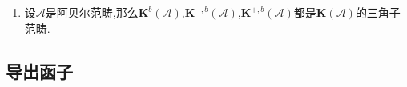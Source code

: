 \begin{enumerate}
\begin{proof}
    	如果$Z$是零调复形,考虑这个好三角诱导的长正合列,就得到$u$是一个拟同构.反过来如果$u$是拟同构,为了证明$Z$是零调复形,只需验证$\mathscr{A}$中的如下正合列如果$X\to Y$和$A\to B$是同构,那么$C$是零对象:同构$X\to Y$的像是它本身,于是$Y\to Z$的核是同构,于是$Y\to Z$是零态射,同理有$Z\to A$是零态射.但是零态射的像是零态射,零态射的核是同构,一个零态射是同构当且仅当它的源端核终端都是零对象,所以$Z$是零对象.
    	$$\xymatrix{X\ar[r]&Y\ar[r]&Z\ar[r]&A\ar[r]&B}$$
    \end{proof}
    \item 设$\mathscr{A}$是阿贝尔范畴,那么$\textbf{K}^b(\mathscr{A})$,$\textbf{K}^{-,b}(\mathscr{A})$,$\textbf{K}^{+,b}(\mathscr{A})$都是$\textbf{K}(\mathscr{A})$的三角子范畴.
\end{enumerate}
\newpage
\subsection{导出函子}

